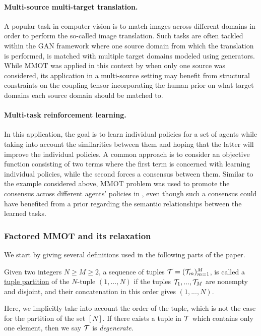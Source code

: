 \paragraph{Multi-source multi-target translation.} A popular task in computer vision is to match images across different domains in order to perform the so-called image translation. Such tasks are often tackled within the GAN framework where one source domain from which the translation is performed, is matched with multiple target domains modeled using generators. While MMOT was applied in this context by \citep{Cao19} when only one source was considered, its application in a multi-source setting may benefit from structural constraints on the coupling tensor incorporating the human prior on what target domains each source domain should be matched to.
\paragraph{Multi-task reinforcement learning.} In this application, the goal is to learn individual policies for a set of agents while taking into account the similarities between them and hoping that the latter will improve the individual policies. A common approach is to consider an objective function consisting of two terms where the first term is concerned with learning individual policies, while the second forces a consensus between them. Similar to the example considered above, MMOT problem was used to promote the consensus across different agents' policies in \citep{Cohen21}, even though such a consensus could have benefited from a prior regarding the semantic relationships between the learned tasks.
%

\subsubsection{Factored MMOT and its relaxation}
We start by giving several definitions used in the following parts of the paper.
\begin{definition}
 Given two integers $N \geq M \geq 2$, a sequence of tuples $\mathcal T = (\mathcal T_m)_{m=1}^M$, is called a
 \underline{tuple partition} of the $N$-tuple $(1,...,N)$ if the tuples $\mathcal T_1, ..., \mathcal T_M$ are nonempty and disjoint,
 and their concatenation in this order gives $(1,...,N)$.
\end{definition}
Here, we implicitly take into account the order of the tuple, which is not the case for the partition of the set $[N]$. If
there exists a tuple in $\mathcal T$ which contains only one element, then we say $\mathcal T$ is \textit{degenerate}.

